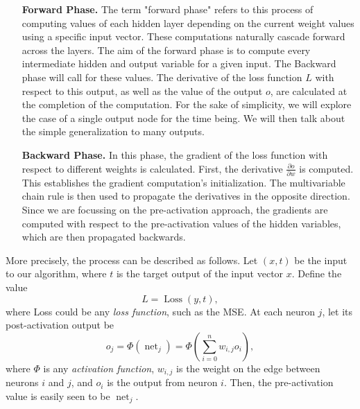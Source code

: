 \documentclass[nobib]{tufte-handout} %
\DeclareMathOperator{\net}{net}
\begin{document}
  \begin{enumerate}
    \item[\bf Forward Phase.] The term "forward phase" refers to this process of computing values of each hidden layer depending on the current weight values using a specific input vector. These computations naturally cascade forward across the layers. The aim of the forward phase is to compute every intermediate hidden and output variable for a given input. The Backward phase will call for these values. The derivative of the loss function $L$ with respect to this output, as well as the value of the output $o$, are calculated at the completion of the computation. For the sake of simplicity, we will explore the case of a single output node for the time being. We will then talk about the simple generalization to many outputs. 

    \item[\bf Backward Phase.] In this phase, the gradient of the loss function with respect to different weights is calculated. First, the derivative $\frac{\partial {o}}{\partial {w}} {}$ is computed. This establishes the gradient computation's initialization. The multivariable chain rule is then used to propagate the derivatives in the opposite direction. Since we are focussing on the pre-activation approach, the gradients are computed with respect to the pre-activation values of the hidden variables, which are then propagated backwards.
  \end{enumerate}
  More precisely, the process can be described as follows. Let $(x,t)$ be the input to our algorithm, where $t$ is the target output of the input vector $x.$ Define the value
  $$L = \operatorname{Loss}(y,t),$$
  where Loss could be any \textit{loss function}, such as the MSE. At each neuron $j$, let its post-activation output be 
  $$o_j = \Phi (\net_j) = \Phi \left( \sum^{n}_{i=0}w_{i,j} o_i  \right) , $$
  where $\Phi$ is any \textit{activation function}, $w_{i,j}$ is the weight on the edge between neurons $i$ and $j$, and $o_i$ is the output from neuron $i.$ Then, the pre-activation value is easily seen to be $\net_j$.
\end{document}

